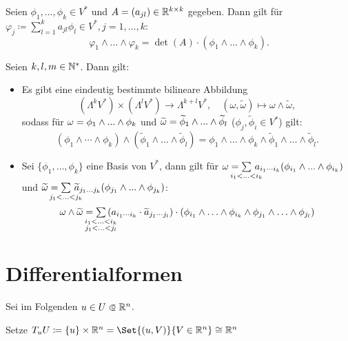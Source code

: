 \documentclass{cheat-sheet}
\theoremstyle{definition}
\begin{document}
\begin{samepage}

\begin{prop}
  Seien $\phi_1, \ldots, \phi_k \in V^*$ und $A = (a_{jl}) \in \mathbb{R}^{k \times k}$ gegeben.
  Dann gilt für $\varphi_j \coloneqq \sum_{l=1}^k a_{jl} \phi_l \in V^*, j = 1, \ldots, k$:
  \[ \varphi_1 \wedge \ldots \wedge \varphi_k = \det(A) \cdot (\phi_1 \wedge \ldots \wedge \phi_k). \]
\end{prop}

\begin{satz}
  Seien $k, l, m \in \mathbb{N}^*$. Dann gilt:
  \begin{itemize}
    \item Es gibt eine eindeutig bestimmte bilineare Abbildung
    \[ (\Lambda^k V^*) \times (\Lambda^l V^*) \to \Lambda^{k+l} V^*, \quad (\omega, \widetilde{\omega}) \mapsto \omega \wedge \widetilde{\omega}, \]
    sodass für $\omega = \phi_1 \wedge ... \wedge \phi_k$ und $\widetilde{\omega} = \widetilde{\phi}_1 \wedge ... \wedge \widetilde{\phi}_l$ ($\phi_j, \widetilde{\phi}_i \in V^*$) gilt:
    \[ (\phi_1 \wedge \cdots \wedge \phi_k) \wedge (\widetilde{\phi}_1 \wedge \ldots \wedge \widetilde{\phi}_l) = \phi_1 \wedge \ldots \wedge \phi_k \wedge \widetilde{\phi}_1 \wedge \ldots \wedge \widetilde{\phi}_l. \]
    \item Sei $\{ \phi_1 , \ldots, \phi_k \}$ eine Basis von $V^*$, dann gilt für $\omega = \sum_{\mathclap{i_1 < \ldots < i_k}} \, a_{i_1 \cdots i_k} (\phi_{i_1} \wedge \nldots \wedge \phi_{i_k})$ und $\widetilde{\omega} = \sum_{\mathclap{j_1 < \ldots < j_k}} \, \widetilde{a}_{j_1 \ldots j_k} (\phi_{j_1} \wedge \nldots \wedge \phi_{j_k})$:
    \[ \omega \wedge \widetilde{\omega} = \sum_{\mathclap{\substack{i_1 < \ldots < i_k \\ j_1 < \ldots < j_l}}} \, (a_{i_1 \cdots i_k} \cdot \widetilde{a}_{j_1 \cdots j_l}) \cdot (\phi_{i_1} \wedge \ldots \wedge \phi_{i_k} \wedge \phi_{j_1} \wedge \ldots \wedge \phi_{j_l}) \]
  \end{itemize}
\end{satz}

\section{Differentialformen}

\end{samepage}


\begin{nota}
  Sei im Folgenden $u \in U \opn \R^n$.

  Setze $T_u U \coloneqq \{ u \} \times \R^n = \Set{ (u, V) }{ V \in \R^n } \cong \R^n$
\end{nota}
\end{document}
